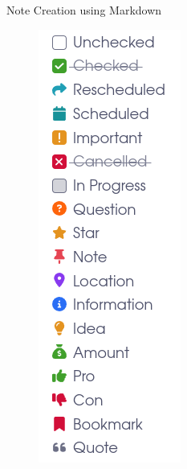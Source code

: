 \documentclass[10pt, xcolor=dvipsnames]{beamer}
\begin{document}
	\begin{frame}{Note Creation using Markdown}
	\begin{figure}
		\centering
		\begin{minipage}{.32\textwidth}
			\centering
			\includegraphics[width=.7\linewidth]{../latex-image/markdown1}

\end{minipage}
\end{figure}
\end{frame}
\end{document}
